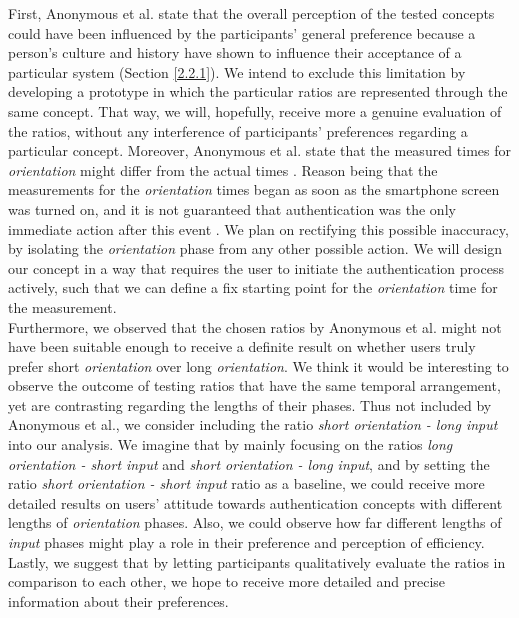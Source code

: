 First, Anonymous et al. \cite{anonymous} state that the overall perception of the tested concepts could have been influenced by the participants' general preference \cite{anonymous} because a person's culture and history have shown to influence their acceptance of a particular system \cite{Harbach:2016} (Section \ref{2.2.1}). We intend to exclude this limitation by developing a prototype in which the particular ratios are represented through the same concept. That way, we will, hopefully, receive more a genuine evaluation of the ratios, without any interference of participants' preferences regarding a particular concept. Moreover, Anonymous et al. \cite{anonymous} state that the measured times for \textit{orientation} might differ from the actual times \cite{anonymous}. Reason being that the measurements for the \textit{orientation} times began as soon as the smartphone screen was turned on, and it is not guaranteed that authentication was the only immediate action after this event \cite{anonymous}. We plan on rectifying this possible inaccuracy, by isolating the \textit{orientation} phase from any other possible action. We will design our concept in a way that requires the user to initiate the authentication process actively, such that we can define a fix starting point for the \textit{orientation} time for the measurement.\\

Furthermore, we observed that the chosen ratios by Anonymous et al. \cite{anonymous} might not have been suitable enough to receive a definite result on whether users truly prefer short \textit{orientation} over long \textit{orientation}. We think it would be interesting to observe the outcome of testing ratios that have the same temporal arrangement, yet are contrasting regarding the lengths of their phases. Thus not included by Anonymous et al., we consider including the ratio \textit{short orientation - long input} into our analysis. We imagine that by mainly focusing on the ratios \textit{long orientation - short input} and \textit{short orientation - long input}, and by setting the ratio \textit{short orientation - short input} ratio as a baseline, we could receive more detailed results on users' attitude towards authentication concepts with different lengths of \textit{orientation} phases. Also, we could observe how far different lengths of \textit{input} phases might play a role in their preference and perception of efficiency. Lastly, we suggest that by letting participants qualitatively evaluate the ratios in comparison to each other, we hope to receive more detailed and precise information about their preferences.  



